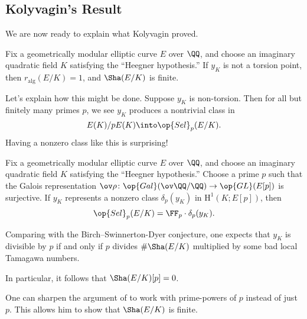 \documentclass[../notes.tex]{subfiles}
\begin{document}
\subsection{Kolyvagin's Result}
We are now ready to explain what Kolyvagin proved.
\begin{theorem}[Kolyvagin]
	Fix a geometrically modular elliptic curve $E$ over $\QQ$, and choose an imaginary quadratic field $K$ satisfying the ``Heegner hypothesis.'' If $y_K$ is not a torsion point, then $r_{\mathrm{alg}}(E/K)=1$, and $\Sha(E/K)$ is finite.
\end{theorem}
Let's explain how this might be done. Suppose $y_K$ is non-torsion. Then for all but finitely many primes $p$, we see $y_K$ produces a nontrivial class in
\[E(K)/pE(K)\into\op{Sel}_p(E/K).\]
Having a nonzero class like this is surprising!
\begin{theorem}[Kolyvagin] \label{thm:kolyvagin-selmer}
	Fix a geometrically modular elliptic curve $E$ over $\QQ$, and choose an imaginary quadratic field $K$ satisfying the ``Heegner hypothesis.'' Choose a prime $p$ such that the Galois representation $\ov\rho\colon\op{Gal}(\ov\QQ/\QQ)\to\op{GL}(E[p])$ is surjective. If $y_K$ represents a nonzero class $\delta_p(y_K)$ in $\mathrm H^1(K;E[p])$, then
	\[\op{Sel}_p(E/K)=\FF_p\cdot\delta_p(y_K).\]
\end{theorem}
\begin{remark}
	Comparing  with the Birch--Swinnerton-Dyer conjecture, one expects that $y_K$ is divisible by $p$ if and only if $p$ divides $\#\Sha(E/K)$ multiplied by some bad local Tamagawa numbers.
\end{remark}
In particular, it follows that $\Sha(E/K)[p]=0$.
\begin{remark}
	One can sharpen the argument of  to work with prime-powers of $p$ instead of just $p$. This allows him to show that $\Sha(E/K)$ is finite.
\end{remark}
\end{document}
